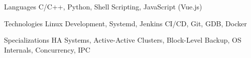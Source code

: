 

\begin{cvskills}

  \cvskill
    {Languages} %
    {C/C++, Python, Shell Scripting, JavaScript (Vue.js)} %

  \cvskill
    {Technologies} %
    {Linux Development, Systemd, Jenkins CI/CD, Git, GDB, Docker} %

  \cvskill
    {Specializations} %
    {HA Systems, Active-Active Clusters, Block-Level Backup, OS Internals, Concurrency, IPC} %

\end{cvskills}